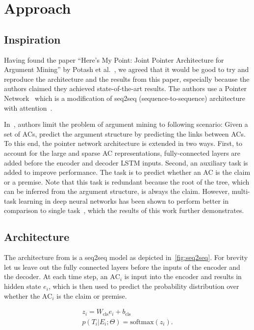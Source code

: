 \documentclass[onecolumn]{article}
\begin{document}
\section{Approach}
\subsection{Inspiration}
Having found the paper ``Here's My Point: Joint Pointer Architecture for Argument Mining'' by Potash et al.~\cite{potash2017here}, we agreed that it
would be good to try and reproduce the architecture and the results from this paper, especially because the authors claimed they achieved
state-of-the-art results. The authors use a Pointer Network~\cite{pn} which is a modification of seq2seq (sequence-to-sequence) architecture~\cite{seq2seq} with attention~\cite{attention}.

In~\cite{potash2017here}, authors limit the problem of argument mining to following scenario:
Given a set of ACs, predict the argument structure by predicting the links between ACs.
To this end, the pointer network architecture is extended in two ways.
First, to account for the large and sparse AC representations, fully-connected layers are added before the encoder and decoder LSTM inputs.
Second, an auxiliary task is added to improve performance. The task is to predict whether an AC is the claim or a premise.
Note that this task is redundant because the root of the tree, which can be inferred from the argument structure, is always the claim.
However, multi-task learning in deep neural networks has been shown to perform better in comparison to single task~\cite{multi}, which the results of this work further demonstrates.

\subsection{Architecture}
The architecture from \cite{potash2017here} is a seq2seq model as depicted in~\autoref{fig:seq2seq}.
For brevity let us leave out the fully connected layers before the inputs of the encoder and the decoder.
At each time step, an $\text{AC}_i$ is input into the encoder and results in hidden state $e_i$,
which is then used to predict the probability distribution over whether the $\text{AC}_i$ is the claim or premise.

\begin{align*}
    z_i = W_{\text{cls}} e_i + b_{\text{cls}}\\
    p(T_i|E_i;\Theta) = \text{softmax}(z_i).
\end{align*}
\end{document}
